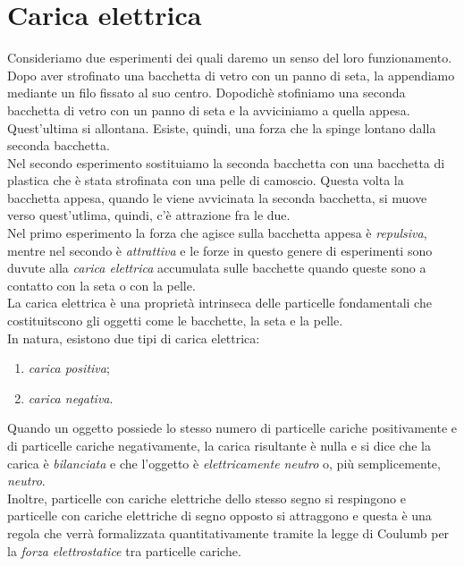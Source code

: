 \documentclass[12pt]{report}
\begin{document}
	\section{Carica elettrica}
	Consideriamo due esperimenti dei quali daremo un senso del loro funzionamento. Dopo aver strofinato una bacchetta di vetro con un panno di seta, la appendiamo mediante un filo fissato al suo centro. Dopodichè stofiniamo una seconda bacchetta di vetro con un panno di seta e la avviciniamo a quella appesa. Quest'ultima si allontana. Esiste, quindi, una forza che la spinge lontano dalla seconda bacchetta. \\
	Nel secondo esperimento sostituiamo la seconda bacchetta con una bacchetta di plastica che è stata strofinata con una pelle di camoscio. Questa volta la bacchetta appesa, quando le viene avvicinata la seconda bacchetta, si muove verso quest'utlima, quindi, c'è attrazione fra le due. \\
	Nel primo esperimento la forza che agisce sulla bacchetta appesa è \textit{repulsiva}, mentre nel secondo è \textit{attrattiva} e le forze in questo genere di esperimenti sono duvute alla \textit{carica elettrica} accumulata sulle bacchette quando queste sono a contatto con la seta o con la pelle. \\
	La carica elettrica è una proprietà intrinseca delle particelle fondamentali che costituitscono gli oggetti come le bacchette, la seta e la pelle. \\
	In natura, esistono due tipi di carica elettrica:
	\begin{enumerate}
		\item \textit{carica positiva};
		\item \textit{carica negativa}.
	\end{enumerate}
	Quando un oggetto possiede lo stesso numero di particelle cariche positivamente e di particelle cariche negativamente, la carica risultante è nulla e si dice che la carica è \textit{bilanciata} e che l'oggetto è \textit{elettricamente neutro} o, più semplicemente, \textit{neutro}. \\
	Inoltre, particelle con cariche elettriche dello stesso segno si respingono e particelle con cariche elettriche di segno opposto si attraggono e questa è una regola che verrà formalizzata quantitativamente tramite la legge di Coulumb per la \textit{forza elettrostatice} tra particelle cariche. \\
\end{document}
